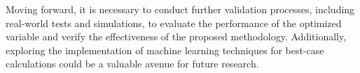Moving forward, it is necessary to conduct further validation processes, including real-world tests and simulations, to evaluate the performance of the optimized variable and verify the effectiveness of the proposed methodology. Additionally, exploring the implementation of machine learning techniques for best-case calculations could be a valuable avenue for future research.


